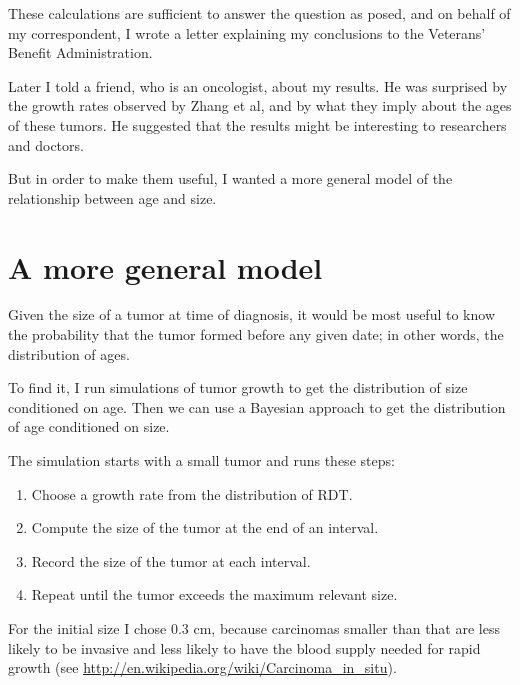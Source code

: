 \documentclass[12pt]{book}
\theoremstyle{exercise}
\begin{document}
These calculations are sufficient to answer the question as
posed, and on behalf of my correspondent, I wrote a letter explaining
my conclusions to the Veterans' Benefit Administration.

Later I told a friend, who is an oncologist, about my results.  He was
surprised by the growth rates observed by Zhang et al, and by what
they imply about the ages of these tumors.  He suggested that the
results might be interesting to researchers and doctors.

But in order to make them useful, I wanted a more general model
of the relationship between age and size.


\section{A more general model}

Given the size of a tumor at time of diagnosis, it would be most
useful to know the probability that the tumor formed before
any given date; in other words, the distribution of ages.

To find it, I run simulations of tumor growth to get the
distribution of size conditioned on age.  Then we can use
a Bayesian approach to get the
distribution of age conditioned on size.

The simulation starts with a small tumor and runs these steps:

\begin{enumerate}

\item Choose a growth rate from the distribution of RDT.

\item Compute the size of the tumor at the end of an interval.

\item Record the size of the tumor at each interval.

\item Repeat until the tumor exceeds the maximum relevant size.

\end{enumerate}

For the initial size I chose 0.3 cm, because carcinomas smaller than
that are less likely to be invasive and less likely to have the blood
supply needed for rapid growth (see
\url{http://en.wikipedia.org/wiki/Carcinoma_in_situ}).  
\end{document}
